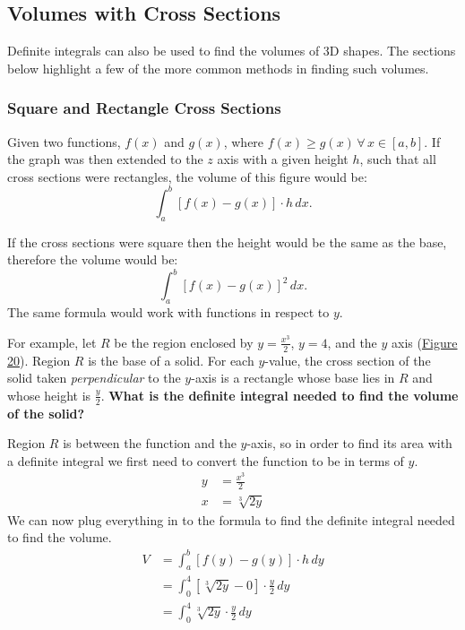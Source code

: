 \documentclass[12pt]{article}
\begin{document}
\subsection{Volumes with Cross Sections}
Definite integrals can also be used to find the volumes of 3D shapes. The sections below highlight a few of the more common methods in finding such volumes.

\subsubsection{Square and Rectangle Cross Sections}
Given two functions, $f(x)$ and $g(x)$, where $f(x) \ge g(x) \, \forall \, x \in [a, b]$. If the graph was then extended to the $z$ axis with a given height $h$, such that all cross sections were rectangles, the volume of this figure would be:
\[ \int_a^b \left[ f(x) - g(x) \right] \cdot h \, dx. \]

If the cross sections were square then the height would be the same as the base, therefore the volume would be:
\[ \int_a^b \left[ f(x) - g(x) \right]^2 \, dx. \]
The same formula would work with functions in respect to $y$.
\bigskip

For example, let $R$ be the region enclosed by $y=\frac{x^3}{2}$, $y=4$, and the $y$ axis (\hyperref[fig:srcross]{Figure 20}). Region $R$ is the base of a solid. For each $y$-value, the cross section of the solid taken \textit{perpendicular} to the $y$-axis is a rectangle whose base lies in $R$ and whose height is $\frac{y}{2}$. \textbf{What is the definite integral needed to find the volume of the solid?}

\noindent Region $R$ is between the function and the $y$-axis, so in order to find its area with a definite integral we first need to convert the function to be in terms of $y$.
\begin{align*}
    y & = \frac{x^3}{2} \\[6pt]
    x & = \sqrt[3]{2y}
\end{align*}
We can now plug everything in to the formula to find the definite integral needed to find the volume.
\begin{align*}
    V & = \int_a^b \left[ f(y) - g(y) \right] \cdot h \, dy                \\
      & = \int_0^4 \left[ \sqrt[3]{2y} - 0 \right] \cdot \frac{y}{2} \, dy \\[6pt]
      & = \int_0^4 \sqrt[3]{2y} \cdot \frac{y}{2} \, dy
\end{align*}
\end{document}
